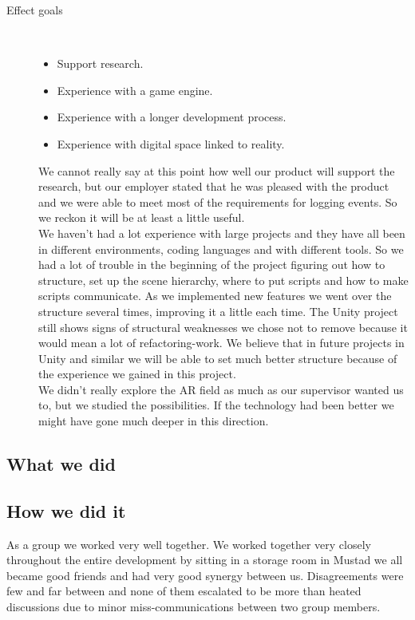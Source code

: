 \begin{description}
	\item[Effect goals]\ 
	\begin{itemize}
		\item Support research.
		\item Experience with a game engine.
		\item Experience with a longer development process.
		\item Experience with digital space linked to reality.
	\end{itemize}
	We cannot really say at this point how well our product will support the research, but our employer stated that he was pleased with the product and we were able to meet most of the requirements for logging events. 
	So we reckon it will be at least a little useful.\\
	We haven't had a lot experience with large projects and they have all been in different environments, coding languages and with different tools. 
	So we had a lot of trouble in the beginning of the project figuring out how to structure, set up the scene hierarchy, where to put scripts and how to make scripts communicate.
	As we implemented new features we went over the structure several times, improving it a little each time. 
	The Unity project still shows signs of structural weaknesses we chose not to remove because it would mean a lot of refactoring-work. 
	We believe that in future projects in Unity and similar we will be able to set much better structure because of the experience we gained in this project.\\
	We didn't really explore the AR field as much as our supervisor wanted us to, but we studied the possibilities. 
	If the technology had been better we might have gone much deeper in this direction.


\end{description}


\subsection{What we did}

\subsection{How we did it}
As a group we worked very well together.
We worked together very closely throughout the entire development by sitting in a storage room in Mustad we all became good friends and had very good synergy between us.
Disagreements were few and far between and none of them escalated to be more than heated discussions due to minor miss-communications between two group members.

